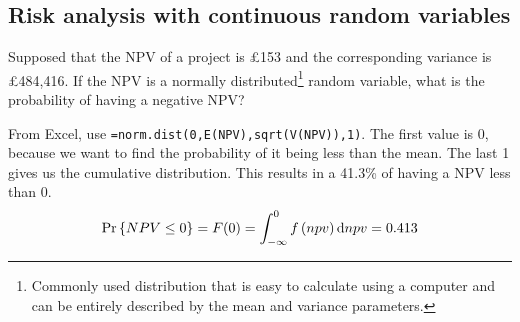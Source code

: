 \subsection{Risk analysis with continuous random variables}
Supposed that the NPV of a project is \pounds 153 and the corresponding variance is \pounds 484,416. If the NPV is a normally distributed\footnote{Commonly used distribution that is easy to calculate using a computer and can be entirely described by the mean and variance parameters.} random variable, what is the probability of having a negative NPV?

From Excel, use \texttt{=norm.dist(0,E(NPV),sqrt(V(NPV)),1)}. The first value is 0, because we want to find the probability of it being less than the mean. The last 1 gives us the cumulative distribution. This results in a 41.3\% of having a NPV less than 0.
\begin{equation}
    \textrm{Pr}\left\{ NPV \leq 0\right\} = F(0) = \int_{-\infty}^0 f\left(npv\right)\dif npv = 0.413
\end{equation}
